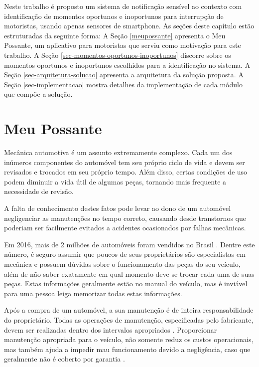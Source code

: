 \label{proposta}

Neste trabalho é proposto um sistema de notificação sensível ao contexto com identificação de momentos oportunos e
inoportunos para interrupção de motoristas, usando apenas sensores de smartphone. As seções deste capítulo estão
estruturadas da seguinte forma: A Seção \ref{meupossante} apresenta o Meu Possante, um aplicativo para motoristas
que serviu como motivação para este trabalho. A Seção \ref{sec-momentos-oportunos-inoportunos} discorre sobre
os momentos oportunos e inoportunos escolhidos para a identificação no sistema. A Seção \ref{sec-arquitetura-solucao}
apresenta a arquitetura da solução proposta. A Seção \ref{sec-implementacao} mostra detalhes da implementação
de cada módulo que compõe a solução.

\section{Meu Possante}{}
\label{meupossante}
Mecânica automotiva é um assunto extremamente complexo. Cada um dos inúmeros componentes
do automóvel tem seu próprio ciclo de vida e devem ser revisados e trocados em seu próprio
tempo. Além disso, certas condições de uso podem diminuir a vida útil de algumas peças,
tornando mais frequente a necessidade de revisão.

A falta de conhecimento destes fatos pode levar ao dono de um automóvel negligenciar
as manutenções no tempo correto, causando desde transtornos que poderiam ser facilmente
evitados a acidentes ocasionados por falhas mecânicas.

Em 2016, mais de 2 milhões de automóveis foram vendidos no Brasil
\cite{fenabrave}. Dentre este número, é seguro assumir que poucos de seus
proprietários são especialistas em mecânica e possuem dúvidas sobre o
funcionamento das peças do seu veículo, além de não saber exatamente em qual
momento deve-se trocar cada uma de suas peças. Estas informações geralmente
estão no manual do veículo, mas é inviável para uma pessoa leiga memorizar
todas estas informações.

Após a compra de um automóvel, a sua manutenção é de inteira responsabilidade
do proprietário. Todas as operações de manutenção, especificadas pelo fabricante,
devem ser realizadas dentro dos intervalos apropriados \cite{manualhyundai}.
Proporcionar manutenção apropriada para o veículo, não somente reduz os custos
operacionais, mas também ajuda a impedir mau funcionamento devido a negligência,
caso que geralmente não é coberto por garantia \cite{manualonix}.

